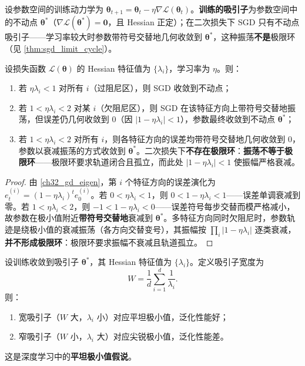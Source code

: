 \begin{definition}[训练的吸引子结构]\label{def:training_attractor}
设参数空间的训练动力学为 $\boldsymbol{\theta}_{t+1}=\boldsymbol{\theta}_t-\eta\nabla\mathcal{L}(\boldsymbol{\theta}_t)$。\textbf{训练的吸引子}为参数空间中的不动点 $\boldsymbol{\theta}^*$（$\nabla\mathcal{L}(\boldsymbol{\theta}^*)=\mathbf{0}$，且 Hessian 正定）；在二次损失下 SGD 只有不动点吸引子——学习率较大时参数带符号交替地几何收敛到 $\boldsymbol{\theta}^*$，这种振荡\textbf{不是}极限环（见 \cref{thm:sgd_limit_cycle}）。
\end{definition}

\begin{theorem}\label{thm:sgd_limit_cycle}
设损失函数 $\mathcal{L}(\boldsymbol{\theta})$ 的 Hessian 特征值为 $\{\lambda_i\}$，学习率为 $\eta$。则：
\begin{enumerate}[label=(\roman*)]
    \item 若 $\eta\lambda_i<1$ 对所有 $i$（过阻尼区），则 SGD 收敛到不动点；
    \item 若 $1<\eta\lambda_i<2$ 对某 $i$（欠阻尼区），则 SGD 在该特征方向上带符号交替地振荡，但误差仍几何收敛到 $0$（因 $|1-\eta\lambda_i|<1$），参数最终收敛到不动点 $\boldsymbol{\theta}^*$；
    \item 若 $1<\eta\lambda_i<2$ 对所有 $i$，则各特征方向的误差均带符号交替地几何收敛到 $0$，参数以衰减振荡的方式收敛到 $\boldsymbol{\theta}^*$。二次损失下\textbf{不存在极限环}：\textbf{振荡不等于极限环}——极限环要求轨道闭合且孤立，而此处 $|1-\eta\lambda_i|<1$ 使振幅严格衰减。
\end{enumerate}
\end{theorem}

\begin{proof}
由 \cref{ch32_gd_eigen}，第 $i$ 个特征方向的误差演化为 $e_t^{(i)}=(1-\eta\lambda_i)^te_0^{(i)}$。若 $0<\eta\lambda_i<1$，则 $0<1-\eta\lambda_i<1$——误差单调衰减到零。若 $1<\eta\lambda_i<2$，则 $-1<1-\eta\lambda_i<0$——误差符号每步交替而模严格减小，故参数在极小值附近\textbf{带符号交替地}衰减到 $\boldsymbol{\theta}^*$。多特征方向同时欠阻尼时，参数轨迹是绕极小值的衰减振荡（各方向交替变号），其振幅按 $\prod_i|1-\eta\lambda_i|$ 逐类衰减，\textbf{并不形成极限环}：极限环要求振幅不衰减且轨道孤立。
\end{proof}

\begin{proposition}[泛化与吸引子宽度的关系]\label{prop:generalisation_attractor_width}
设训练收敛到吸引子 $\boldsymbol{\theta}^*$，其 Hessian 特征值为 $\{\lambda_i\}$。定义吸引子宽度为
\[
W=\frac{1}{d}\sum_{i=1}^{d}\frac{1}{\lambda_i}.
\]
则：
\begin{enumerate}[label=(\roman*)]
    \item 宽吸引子（$W$ 大，$\lambda_i$ 小）对应平坦极小值，泛化性能好；
    \item 窄吸引子（$W$ 小，$\lambda_i$ 大）对应尖锐极小值，泛化性能差。
\end{enumerate}
这是深度学习中的\textbf{平坦极小值假说}。
\end{proposition}

